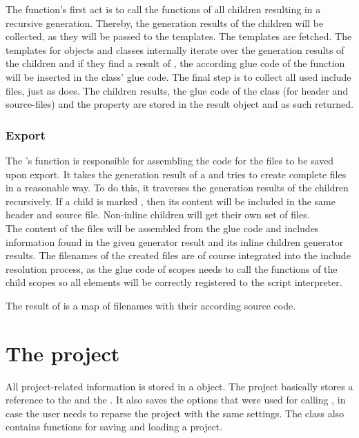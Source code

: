 The  function's first act is to call the  functions of all children resulting in a recursive generation. Thereby, the generation results of the children will be collected, as they will be passed to the templates. The templates are fetched. The templates for objects and classes internally iterate over the generation results of the children and if they find a result of  , the according glue code of the function will be inserted in the class' glue code.
The final step is to collect all used include files, just as  does.  The children results, the glue code  of the class (for header and source-files) and the  property are stored in the result object and as such returned. \\

\subsubsection{Export}

The 's  function is responsible for assembling the code for the files to be saved upon export. It takes the generation result of a \linebreak{} and tries to create complete files in a reasonable way. To do this, it traverses the generation results of the children recursively. If a child is marked , then its content will be included in the same header and source file. Non-inline children will get their own set of files.\\
The content of the files will be assembled from the glue code and includes information found in the given generator result and its inline children generator results. The filenames of the created files are of course integrated into the include resolution process, as the glue code of scopes needs to call the  functions of the child scopes so all elements will be correctly registered to the script interpreter.

The result of  is a map of filenames with their according source code.

\section{The project}
\label{sec:Project}

All project-related information is stored in a  object. The project basically stores a reference to the  and the . It also saves the options that were used for calling , in case the user needs to reparse the project with the same settings. The  class also contains functions for saving and loading a project.

